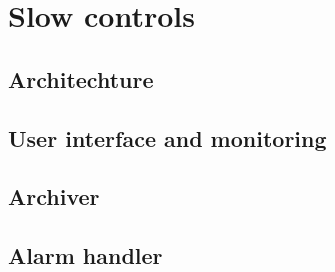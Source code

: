 
\section[Slow controls (Hovanes)]{Slow controls \label{sec:controls}}
\subsection{Architechture \label{sec:controlsarchitechture}}
\subsection{User interface and monitoring \label{sec:controlsinterface}}
\subsection{Archiver \label{sec:archiver}}
\subsection{Alarm handler \label{sec:alarms}}
